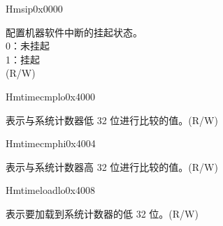 


\begin{register}{H}{msip}{0x0000}\label{regdesc:CLINTMSIPREG}
%
%
\regnewline%
\begin{regdesc}
\begin{reglist}
\label{fielddesc:CLINTMSIP}\item[MSIP] 配置机器软件中断的挂起状态。\\
0：未挂起\\
1：挂起\\
(R/W)
\end{reglist}
\end{regdesc}
\end{register}

\begin{register}{H}{mtimecmplo}{0x4000}\label{regdesc:CLINTMTIMECMPLOREG}
%
\regnewline%
\begin{regdesc}
\begin{reglist}
\label{fielddesc:CLINTMTIMECMPLO}\item [MTIMECMPLO] 表示与系统计数器低 32 位进行比较的值。(R/W)
\end{reglist}
\end{regdesc}
\end{register}

\begin{register}{H}{mtimecmphi}{0x4004}\label{regdesc:CLINTMTIMECMPHIREG}
%
\regnewline%
\begin{regdesc}
\begin{reglist}
\label{fielddesc:CLINTMTIMECMPHI}\item [MTIMECMPHI] 表示与系统计数器高 32 位进行比较的值。(R/W)
\end{reglist}
\end{regdesc}
\end{register}


\begin{register}{H}{mtimeloadlo}{0x4008}\label{regdesc:CLINTMTIMELOADLOREG}
%
\regnewline%
\begin{regdesc}
\begin{reglist}
\label{fielddesc:CLINTMTIMELOADLO}\item [MTIME\_LOADLO] 表示要加载到系统计数器的低 32 位。(R/W)
\end{reglist}
\end{regdesc}
\end{register}

